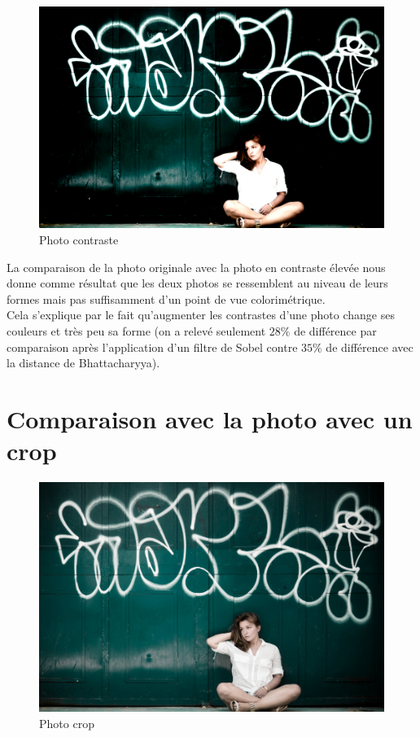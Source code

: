 \documentclass[]{article}
\begin{document}
\begin{figure}[htbp]
\centering
\includegraphics{photos/contraste.jpg}
\caption{Photo contraste}
\end{figure}

La comparaison de la photo originale avec la photo en
contraste élevée nous donne comme résultat que les deux photos se
ressemblent au niveau de leurs formes mais pas suffisamment d'un point
de vue colorimétrique. \\
Cela s'explique par le fait qu'augmenter les contrastes d'une photo change ses
couleurs et très peu sa forme (on a relevé seulement $28\%$ de différence par
comparaison après l'application d'un filtre de Sobel contre $35\%$ de différence
avec la distance de Bhattacharyya).

\newpage

\section{Comparaison avec la photo avec un
crop}\label{comparaison-avec-la-photo-avec-un-crop}

\begin{figure}[htbp]
\centering
\includegraphics{photos/crop.jpg}
\caption{Photo crop}
\end{figure}
\end{document}
